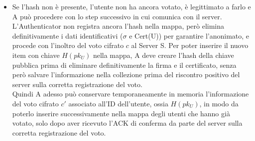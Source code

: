 \begin{enumerate}
\begin{itemize}
				\item Se l'hash non è presente, l'utente non ha ancora votato, è legittimato a farlo e A può procedere con lo step successivo in cui comunica con il server. L'Authenticator non registra ancora l'hash nella mappa, però elimina definitivamente i dati identificativi ($\sigma$ e Cert(U)) per garantire l'anonimato, e procede con l'inoltro del voto cifrato $c$ al Server S. Per poter inserire il nuovo item con chiave $H(pk_U)$ nella mappa, A deve creare l'hash della chiave pubblica prima di eliminare definitivamente la firma e il certificato, senza però salvare l'informazione nella collezione prima del riscontro positivo del server sulla corretta registrazione del voto.\\
				Quindi A adesso può conservare temporaneamente in memoria l'informazione del voto cifrato $c'$ associato all'ID dell'utente, ossia $H(pk_U)$, in modo da poterlo inserire successivamente nella mappa degli utenti che hanno già votato, solo dopo aver ricevuto l'ACK di conferma da parte del server sulla corretta registrazione del voto.
			\end{itemize}
		\end{enumerate}	
			
			
			
